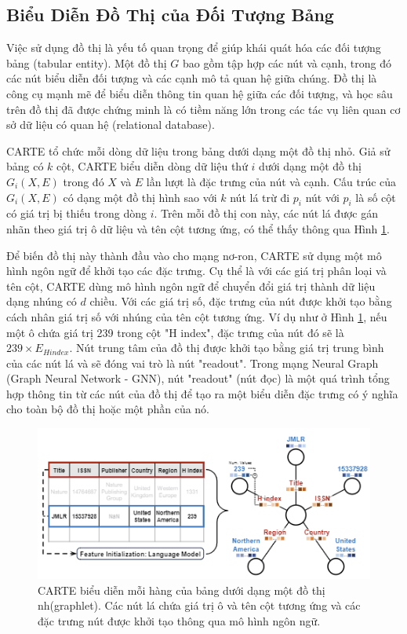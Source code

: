 \documentclass{article}
\begin{document}
\subsection{Biểu Diễn Đồ Thị của Đối Tượng Bảng} \label{sec:graph_representation}
Việc sử dụng đồ thị là yếu tố quan trọng để giúp khái quát hóa các đối tượng bảng (tabular entity). Một đồ thị $G$ bao gồm tập hợp các nút và cạnh, trong đó các nút biểu diễn đối tượng và các cạnh mô tả quan hệ giữa chúng. Đồ thị là công cụ mạnh mẽ để biểu diễn thông tin quan hệ giữa các đối tượng, và học sâu trên đồ thị đã được chứng minh là có tiềm năng lớn trong các tác vụ liên quan cơ sở dữ liệu có quan hệ (relational database).

CARTE tổ chức mỗi dòng dữ liệu trong bảng dưới dạng một đồ thị nhỏ. Giả sử bảng có $k$ cột, CARTE biểu diễn dòng dữ liệu thứ $i$ dưới dạng một đồ thị $G_i(X,E)$ trong đó $X$ và $E$ lần lượt là đặc trưng của nút và cạnh. Cấu trúc của $G_i(X,E)$ có dạng một đồ thị hình sao với $k$ nút lá trừ đi $p_i$ nút với $p_i$ là số cột có giá trị bị thiếu trong dòng $i$. Trên mỗi đồ thị con này, các nút lá được gán nhãn theo giá trị ô dữ liệu và tên cột tương ứng, có thể thấy thông qua Hình \ref{fig:graphlet_representation_of_tabular_entity}.

Để biến đồ thị này thành đầu vào cho mạng nơ-ron, CARTE sử dụng một mô hình ngôn ngữ để khởi tạo các đặc trưng. Cụ thể là với các giá trị phân loại và tên cột, CARTE dùng mô hình ngôn ngữ để chuyển đổi giá trị thành dữ liệu dạng nhúng có $d$ chiều. Với các giá trị số, đặc trưng của nút được khởi tạo bằng cách nhân giá trị số với nhúng của tên cột tương ứng. Ví dụ như ở Hình \ref{fig:graphlet_representation_of_tabular_entity}, nếu một ô chứa giá trị 239 trong cột "H index", đặc trưng của nút đó sẽ là $239 \times E_{H index}$. Nút trung tâm của đồ thị được khởi tạo bằng giá trị trung bình của các nút lá và sẽ đóng vai trò là nút "readout". Trong mạng Neural Graph (Graph Neural Network - GNN), nút "readout" (nút đọc) là một quá trình tổng hợp thông tin từ các nút của đồ thị để tạo ra một biểu diễn đặc trưng có ý nghĩa cho toàn bộ đồ thị hoặc một phần của nó. 

\begin{figure} 
    \centering
    \includegraphics[scale = 1]{graphlet_representation_of_tabular_entity.png}
    \caption{CARTE biểu diễn mỗi hàng của bảng dưới dạng một đồ thị nh(graphlet). Các nút lá chứa giá trị ô và tên cột tương ứng và các đặc trưng nút được khởi tạo thông qua mô hình ngôn ngữ.}
    \label{fig:graphlet_representation_of_tabular_entity}
\end{figure}
\end{document}
